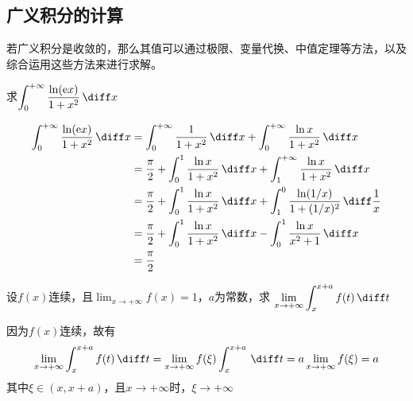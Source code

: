 \subsection{广义积分的计算}
若广义积分是收敛的，那么其值可以通过极限、变量代换、中值定理等方法，以及综合运用这些方法来进行求解。
\begin{example}
    求$\displaystyle\int_0^{+\infty}\frac{\ln(\mathrm{e}x)}{1+x^2}\,\diff x$
\end{example}
\begin{solution}
    \begin{align*}
        \int_0^{+\infty}\frac{\ln(\mathrm{e}x)}{1+x^2}\,\diff x
         & = \int_0^{+\infty} \frac{1}{1+x^2}\,\diff x + \int_0^{+\infty}\frac{\ln x}{1+x^2}\,\diff x                        \\
         & = \frac{\pi}{2} + \int_0^1 \frac{\ln x}{1+x^2}\,\diff x + \int_1^{+\infty} \frac{\ln x}{1+x^2}\,\diff x           \\
         & = \frac{\pi}{2} + \int_0^1 \frac{\ln x}{1+x^2}\,\diff x + \int_1^0 \frac{\ln (1/x)}{1+(1/x)^2}\,\diff \frac{1}{x} \\
         & = \frac{\pi}{2} + \int_0^1 \frac{\ln x}{1+x^2}\,\diff x - \int_0^1 \frac{\ln x}{x^2+1}\,\diff x                   \\
         & = \frac{\pi}{2}
    \end{align*}
\end{solution}

\begin{example}
    设$f(x)$连续，且$\displaystyle\lim_{x\to+\infty} f(x) = 1$，$a$为常数，求
    $\displaystyle\lim_{x\to+\infty}\int_x^{x+a}f(t)\,\diff t$
\end{example}
\begin{solution}
    因为$f(x)$连续，故有
    \[
        \lim_{x\to+\infty}\int_x^{x+a}f(t)\,\diff t
        =
        \lim_{x\to+\infty}f(\xi)\int_x^{x+a}\,\diff t
        =
        a\lim_{x\to+\infty} f(\xi)
        =
        a
    \]
    其中$\xi\in(x,x+a)$，且$x\to+\infty$时，$\xi\to+\infty$
\end{solution}

